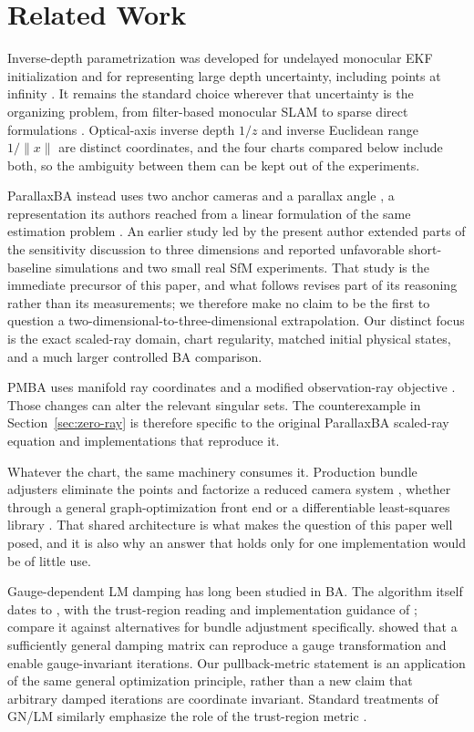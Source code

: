 \documentclass[11pt,a4paper]{article}
\let\cite\citep
\theoremstyle{definition}
\theoremstyle{remark}
\begin{document}
\section{Related Work}
Inverse-depth parametrization was developed for undelayed monocular EKF initialization and for representing large depth uncertainty, including points at infinity \cite{civera2008inverse}. It remains the standard choice wherever that uncertainty is the organizing problem, from filter-based monocular SLAM \cite{strasdat2010scaledrift,murartal2015orbslam} to sparse direct formulations \cite{engel2018dso}. Optical-axis inverse depth $1/z$ and inverse Euclidean range $1/\|x\|$ are distinct coordinates, and the four charts compared below include both, so the ambiguity between them can be kept out of the experiments.

ParallaxBA instead uses two anchor cameras and a parallax angle \cite{zhao2015parallaxba}, a representation its authors reached from a linear formulation of the same estimation problem \cite{zhao2014linear}. An earlier study led by the present author \cite{zuo2023applicability} extended parts of the sensitivity discussion to three dimensions and reported unfavorable short-baseline simulations and two small real SfM experiments. That study is the immediate precursor of this paper, and what follows revises part of its reasoning rather than its measurements; we therefore make no claim to be the first to question a two-dimensional-to-three-dimensional extrapolation. Our distinct focus is the exact scaled-ray domain, chart regularity, matched initial physical states, and a much larger controlled BA comparison.

PMBA uses manifold ray coordinates and a modified observation-ray objective \cite{liu2018pmba}. Those changes can alter the relevant singular sets. The counterexample in Section~\ref{sec:zero-ray} is therefore specific to the original ParallaxBA scaled-ray equation and implementations that reproduce it.

Whatever the chart, the same machinery consumes it. Production bundle adjusters eliminate the points and factorize a reduced camera system \cite{lourakis2009sba}, whether through a general graph-optimization front end \cite{kummerle2011g2o} or a differentiable least-squares library \cite{ceres2023}. That shared architecture is what makes the question of this paper well posed, and it is also why an answer that holds only for one implementation would be of little use.

Gauge-dependent LM damping has long been studied in BA. The algorithm itself dates to \citet{marquardt1963}, with the trust-region reading and implementation guidance of \citet{more1978}; \citet{lourakis2005lm} compare it against alternatives for bundle adjustment specifically. \citet{bartoli2003gauge} showed that a sufficiently general damping matrix can reproduce a gauge transformation and enable gauge-invariant iterations. Our pullback-metric statement is an application of the same general optimization principle, rather than a new claim that arbitrary damped iterations are coordinate invariant. Standard treatments of GN/LM similarly emphasize the role of the trust-region metric \cite{nocedal2006numerical}.
\end{document}
